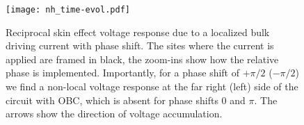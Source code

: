 \begin{figure}[!htbp]
\centering
\texttt{[image: nh\_time-evol.pdf]}
\caption[Reciprocal skin effect voltage response due to a localized bulk driving current with phase shift]{Reciprocal skin effect voltage response due to a localized bulk driving current with phase shift. The sites where the current is applied are framed in black, the zoom-ins show how the relative phase is implemented. Importantly, for a phase shift of $+\pi/2$ ($-\pi/2$) we find a non-local voltage response at the far right (left) side of the circuit with OBC, which is absent for phase shifts $0$ and $\pi$. The arrows show the direction of voltage accumulation.}
\label{fig: S3}
\end{figure}